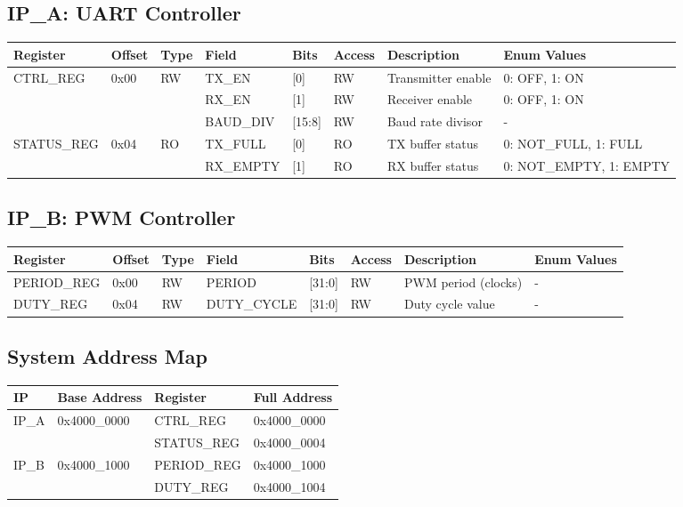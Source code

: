 \documentclass{article}
\begin{document}
\subsection*{IP\_A: UART Controller}
\begin{tabular}{|l|l|l|l|l|l|p{3.5cm}|p{3.2cm}|}
\hline
\textbf{Register} & \textbf{Offset} & \textbf{Type} & \textbf{Field} & \textbf{Bits} & \textbf{Access} & \textbf{Description} & \textbf{Enum Values} \\
\hline
\multirow{3}{*}{CTRL\_REG} & \multirow{3}{*}{0x00} & \multirow{3}{*}{RW} & TX\_EN & [0] & RW & Transmitter enable & 0: OFF, 1: ON \\
\cline{4-8}
& & & RX\_EN & [1] & RW & Receiver enable & 0: OFF, 1: ON \\
\cline{4-8}
& & & BAUD\_DIV & [15:8] & RW & Baud rate divisor & - \\
\hline
\multirow{2}{*}{STATUS\_REG} & \multirow{2}{*}{0x04} & \multirow{2}{*}{RO} & TX\_FULL & [0] & RO & TX buffer status & 0: NOT\_FULL, 1: FULL \\
\cline{4-8}
& & & RX\_EMPTY & [1] & RO & RX buffer status & 0: NOT\_EMPTY, 1: EMPTY \\
\hline
\end{tabular}

\vspace{1cm}

\subsection*{IP\_B: PWM Controller}
\begin{tabular}{|l|l|l|l|l|l|p{4cm}|l|}
\hline
\textbf{Register} & \textbf{Offset} & \textbf{Type} & \textbf{Field} & \textbf{Bits} & \textbf{Access} & \textbf{Description} & \textbf{Enum Values} \\
\hline
PERIOD\_REG & 0x00 & RW & PERIOD & [31:0] & RW & PWM period (clocks) & - \\
\hline
DUTY\_REG & 0x04 & RW & DUTY\_CYCLE & [31:0] & RW & Duty cycle value & - \\
\hline
\end{tabular}

\vspace{1cm}

\subsection*{System Address Map}
\begin{tabular}{|l|l|l|l|}
\hline
\textbf{IP} & \textbf{Base Address} & \textbf{Register} & \textbf{Full Address} \\
\hline
\multirow{2}{*}{IP\_A} & \multirow{2}{*}{0x4000\_0000} & CTRL\_REG & 0x4000\_0000 \\
\cline{3-4}
& & STATUS\_REG & 0x4000\_0004 \\
\hline
\multirow{2}{*}{IP\_B} & \multirow{2}{*}{0x4000\_1000} & PERIOD\_REG & 0x4000\_1000 \\
\cline{3-4}
& & DUTY\_REG & 0x4000\_1004 \\
\hline
\end{tabular}
\end{document}
